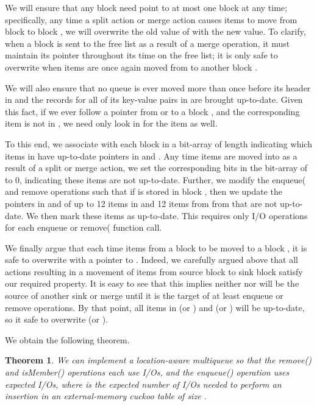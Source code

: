 \documentclass[11pt,letterpaper]{article}
\newtheorem{theorem}{Theorem}
\begin{document}
We will ensure that any block 
need point to at most one block  at any time; specifically, any time a split action or merge action
causes items to move from block  to block , we will overwrite the old value of  with the new value. To clarify, when a block  is sent to the free list as a result of 
a merge operation, it must maintain its pointer  throughout its time on the free list; it is only safe to overwrite  when items are 
once again moved
from  to another block .

We will also ensure that no queue is ever moved more than once before its header in  and the records for all of its
key-value pairs in  are brought up-to-date. Given this fact, 
if we ever follow a pointer from  or  to a block , and the corresponding
item is not in , we need only look in  for the item as well. 

To this end, we associate with each block  in  a bit-array of length  indicating which items in
 have up-to-date pointers in  and . Any time items are moved into  as a result
of a split or merge action, we set the corresponding bits in the bit-array of  to 0, indicating
these items are not up-to-date. Further, we modify the
enqueue( and remove operations such that if  is stored in block , then we 
update the pointers in  and 
of up to 12 items in  and 12 items from
from  that are not up-to-date. We then mark these items as up-to-date. This requires only  I/O operations for each enqueue or remove(
function call.

We finally argue that each time items from a block
 to be moved to a block ,
it is safe to overwrite  with a pointer to . Indeed, we carefully argued above that all actions resulting in a movement of items from source block  to sink block  satisfy our required property. It is easy to see that this implies neither  nor  will be the source of another sink or merge until it is the target of at least  enqueue or remove operations. By that point, all items in  (or ) and  (or ) will be up-to-date, so it safe to overwrite  (or ).



We obtain the following theorem.

\begin{theorem} \label{thm:multiqueue}
We can implement a location-aware multiqueue so that 
the remove() and isMember()
operations each use  I/Os,
and the enqueue() operation uses  expected I/Os,
where  is the expected number of I/Os needed to perform an
insertion in an external-memory cuckoo table of size .
\end{theorem}
\end{document}
